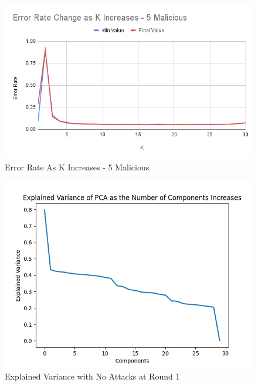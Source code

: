 \begin{figure}[htbp]
	\centering
    \includegraphics[scale=0.5]{my_agg/graphs/k_elbow_5.png}
	\caption{Error Rate As K Increases - 5 Malicious}
	\label{fig:k_elbow_5}
\end{figure}

\begin{figure}[htbp]
	\centering
    \includegraphics[scale=0.5]{my_agg/graphs/0_r1.png}
	\caption{Explained Variance with No Attacks at Round 1}
	\label{fig:pca_01}
\end{figure}

